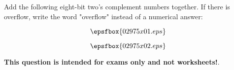

Add the following eight-bit two's complement numbers together.  If there is overflow, write the word "overflow" instead of a numerical answer:

\vskip 10pt

$$\epsfbox{02975x01.eps}$$

\vskip 10pt







$$\epsfbox{02975x02.eps}$$







{\bf This question is intended for exams only and not worksheets!}.




